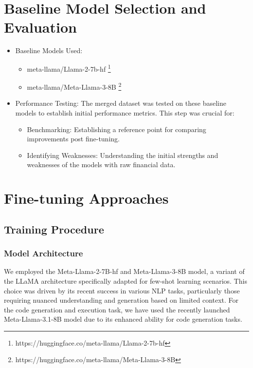 \documentclass[logo,msc]{infthesis}           %
\begin{document}
\section{Baseline Model Selection and Evaluation}
\begin{itemize}
    \item Baseline Models Used:
    \begin{itemize}
        \item meta-llama/Llama-2-7b-hf \footnote{https://huggingface.co/meta-llama/Llama-2-7b-hf}
        \item meta-llama/Meta-Llama-3-8B \footnote{https://huggingface.co/meta-llama/Meta-Llama-3-8B}
    \end{itemize}
    \item Performance Testing: The merged dataset was tested on these baseline models to establish initial performance metrics. This step was crucial for:
    \begin{itemize}
        \item Benchmarking: Establishing a reference point for comparing improvements post fine-tuning.
        \item Identifying Weaknesses: Understanding the initial strengths and weaknesses of the models with raw financial data.
    \end{itemize}
\end{itemize}
\section{Fine-tuning Approaches}

\subsection{Training Procedure}
\subsubsection*{Model Architecture} We employed the Meta-Llama-2-7B-hf and Meta-Llama-3-8B model, a variant of the LLaMA architecture specifically adapted for few-shot learning scenarios. This choice was driven by its recent success in various NLP tasks, particularly those requiring nuanced understanding and generation based on limited context. For the code generation and execution task, we have used the recently launched Meta-Llama-3.1-8B model due to its enhanced ability for code generation tasks.
\end{document}
